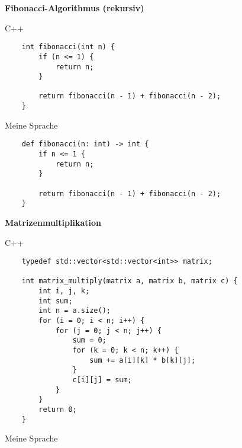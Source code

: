         \begin{center}
            \textbf{Fibonacci-Algorithmus (rekursiv)}
        \end{center}

        \begin{center}
            C++
        \end{center}

        \begin{lstlisting}
    int fibonacci(int n) {
        if (n <= 1) {
            return n;
        }

        return fibonacci(n - 1) + fibonacci(n - 2);
    }
        \end{lstlisting}
        \newpage
        \begin{center}
            Meine Sprache
        \end{center}

        \begin{lstlisting}
    def fibonacci(n: int) -> int {
        if n <= 1 {
            return n;
        }

        return fibonacci(n - 1) + fibonacci(n - 2);
    }
        \end{lstlisting}

        \begin{center}
            \textbf{Matrizenmultiplikation}
        \end{center}

        \begin{center}
            C++
        \end{center}

        \begin{lstlisting}
    typedef std::vector<std::vector<int>> matrix;

    int matrix_multiply(matrix a, matrix b, matrix c) {
        int i, j, k;
        int sum;
        int n = a.size();
        for (i = 0; i < n; i++) {
            for (j = 0; j < n; j++) {
                sum = 0;
                for (k = 0; k < n; k++) {
                    sum += a[i][k] * b[k][j];
                }
                c[i][j] = sum;
            }
        }
        return 0;
    }
        \end{lstlisting}
        \newpage
        \begin{center}
            Meine Sprache
        \end{center}

